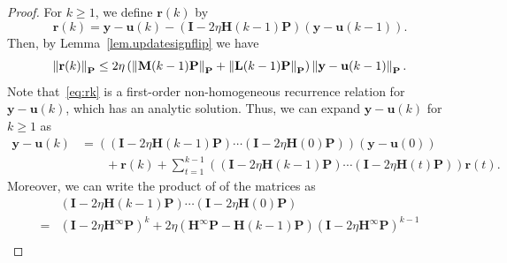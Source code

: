 \begin{proof}
For $k\geq 1$, we define $\mathbf{r}(k)$ by 
\begin{equation}\label{eq:rk}
    \mathbf{r}(k) = \mathbf{y} - \mathbf{u}(k) - \left(\mathbf{I} - 2\eta \mathbf{H}(k-1)\mathbf{P}\right)(\mathbf{y} - \mathbf{u}(k-1)).
\end{equation}
Then, by Lemma~\ref{lem.updatesignflip} we have
\begin{equation}\label{eq:rk_bound}
    \left\lVert\mathbf{r}(k)\right\rVert_{\mathbf{P}} \leq 2\eta \left(\left\lVert\mathbf{M}(k-1)\mathbf{P}\right\rVert_{\mathbf{P}} + \left\lVert\mathbf{L}(k-1)\mathbf{P}\right\rVert_{\mathbf{P}}\right) \left\lVert\mathbf{y} - \mathbf{u}(k-1)\right\rVert_{\mathbf{P}}.
\end{equation}
Note that~\cref{eq:rk} is a first-order non-homogeneous recurrence relation for $\mathbf{y} - \mathbf{u}(k)$, which has an analytic solution. Thus, we can expand $\mathbf{y} - \mathbf{u}(k)$ for $k\geq 1$ as
\begin{equation}\label{eq.techexpand1}
    \begin{aligned}
    \mathbf{y} - \mathbf{u}(k) &= \left((\mathbf{I} - 2\eta \mathbf{H}(k-1)\mathbf{P}) \cdots (\mathbf{I} - 2\eta \mathbf{H}(0)\mathbf{P})\right) (\mathbf{y} - \mathbf{u}(0)) \\
    &\qquad + \mathbf{r}(k) + \sum_{t=1}^{k-1} \left((\mathbf{I} - 2\eta \mathbf{H}(k-1)\mathbf{P}) \cdots (\mathbf{I} - 2\eta \mathbf{H}(t)\mathbf{P})\right) \mathbf{r}(t).
    \end{aligned}
\end{equation}
Moreover, we can write the product of of the matrices as~\citep{suyang}
\begin{equation}\label{eq.techexpand2}
    \begin{aligned}
    &(\mathbf{I} - 2\eta \mathbf{H}(k-1)\mathbf{P}) \cdots (\mathbf{I} - 2\eta \mathbf{H}(0)\mathbf{P})\\
    = & (\mathbf{I} - 2\eta \mathbf{H}^\infty\mathbf{P})^{k} + 2\eta (\mathbf{H}^\infty\mathbf{P} \!-\!\mathbf{H}(k\!-\!1)\mathbf{P}) (\mathbf{I} \!-\! 2\eta \mathbf{H}^\infty\mathbf{P})^{k-1} \\

\end{aligned}
\end{equation}
\end{proof}
